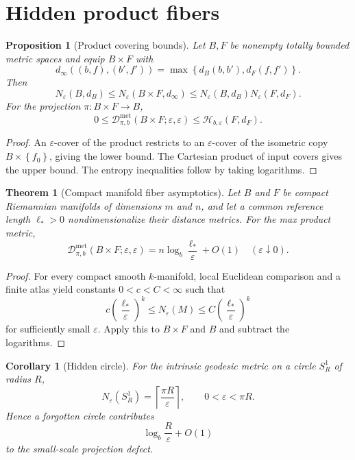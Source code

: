 \documentclass[11pt,a4paper]{article}
\theoremstyle{definition}
\theoremstyle{plain}
\newtheorem{theorem}[definition]{Theorem}
\newtheorem{proposition}[definition]{Proposition}
\newtheorem{corollary}[definition]{Corollary}
\theoremstyle{remark}
\newcommand{\Hmet}{\mathscr{H}}
\newcommand{\Dmet}{\mathscr{D}^{\mathrm{met}}}
\newcommand{\set}[1]{\left\{#1\right\}}
\begin{document}
\section{Hidden product fibers}

\begin{proposition}[Product covering bounds]
\label{prop:product}
Let $B,F$ be nonempty totally bounded metric spaces and equip $B\times F$
with
\[
d_\infty((b,f),(b',f'))
=
\max\set{d_B(b,b'),d_F(f,f')}.
\]
Then
\[
N_\varepsilon(B,d_B)
\leq
N_\varepsilon(B\times F,d_\infty)
\leq
N_\varepsilon(B,d_B)N_\varepsilon(F,d_F).
\]
For the projection $\pi:B\times F\to B$,
\[
0\leq
\Dmet_{\pi,b}(B\times F;\varepsilon,\varepsilon)
\leq
\Hmet_{b,\varepsilon}(F,d_F).
\]
\end{proposition}

\begin{proof}
An $\varepsilon$-cover of the product restricts to an
$\varepsilon$-cover of the isometric copy $B\times\set{f_0}$, giving the
lower bound. The Cartesian product of input covers gives the upper bound.
The entropy inequalities follow by taking logarithms.
\end{proof}

\begin{theorem}[Compact manifold fiber asymptotics]
\label{thm:manifold-fiber}
Let $B$ and $F$ be compact Riemannian manifolds of dimensions $m$ and $n$,
and let a common reference length $\ell_*>0$ nondimensionalize their
distance metrics. For the max product metric,
\[
\Dmet_{\pi,b}(B\times F;\varepsilon,\varepsilon)
=
n\log_b\frac{\ell_*}{\varepsilon}+O(1)
\quad
(\varepsilon\downarrow0).
\]
\end{theorem}

\begin{proof}
For every compact smooth $k$-manifold, local Euclidean comparison and a
finite atlas yield constants $0<c<C<\infty$ such that
\[
c\left(\frac{\ell_*}{\varepsilon}\right)^k
\leq
N_\varepsilon(M)
\leq
C\left(\frac{\ell_*}{\varepsilon}\right)^k
\]
for sufficiently small $\varepsilon$. Apply this to $B\times F$ and $B$
and subtract the logarithms.
\end{proof}

\begin{corollary}[Hidden circle]
For the intrinsic geodesic metric on a circle $S^1_R$ of radius $R$,
\[
N_\varepsilon(S^1_R)
=
\left\lceil\frac{\pi R}{\varepsilon}\right\rceil,
\qquad
0<\varepsilon<\pi R.
\]
Hence a forgotten circle contributes
\[
\log_b\frac{R}{\varepsilon}+O(1)
\]
to the small-scale projection defect.
\end{corollary}
\end{document}
